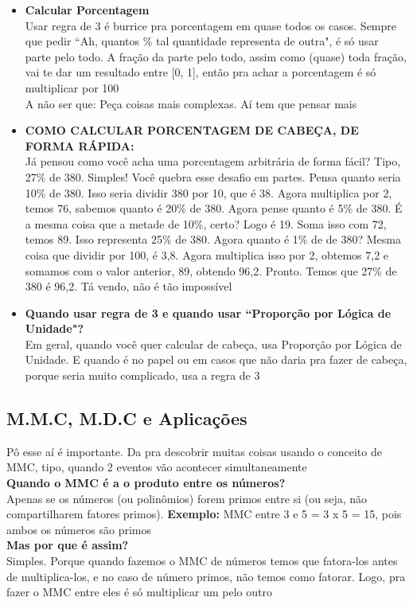 \documentclass{article}
\begin{document}
\begin{itemize}
    \item \textbf{Calcular Porcentagem}\\[5pt] Usar regra de 3 é burrice pra porcentagem em quase todos os casos. Sempre que pedir ``Ah, quantos \% tal quantidade representa de outra", é só usar parte pelo todo. A fração da parte pelo todo, assim como (quase) toda fração, vai te dar um resultado entre [0, 1], então pra achar a porcentagem é só multiplicar por 100
    \\[5pt]
    A não ser que: Peça coisas mais complexas. Aí tem que pensar mais

    \item \textbf{COMO CALCULAR PORCENTAGEM DE CABEÇA, DE FORMA RÁPIDA:}\\[5pt] Já pensou como você acha uma porcentagem arbitrária de forma fácil? Tipo, 27\% de 380. Simples! Você quebra esse desafio em partes. Pensa quanto seria 10\% de 380. Isso seria dividir 380 por 10, que é 38. Agora multiplica por 2, temos 76, sabemos quanto é 20\% de 380. Agora pense quanto é 5\% de 380. É a mesma coisa que a metade de 10\%, certo? Logo é 19. Soma isso com 72, temos 89. Isso representa 25\% de 380. Agora quanto é 1\% de de 380? Mesma coisa que dividir por 100, é 3,8. Agora multiplica isso por 2, obtemos 7,2 e somamos com o valor anterior, 89, obtendo 96,2. Pronto. Temos que 27\% de 380 é 96,2. Tá vendo, não é tão impossível 

    \item \textbf{Quando usar regra de 3 e quando usar ``Proporção por Lógica de Unidade"?}\\[5pt] Em geral, quando você quer calcular de cabeça, usa Proporção por Lógica de Unidade. E quando é no papel ou em casos que não daria pra fazer de cabeça, porque seria muito complicado, usa a regra de 3
\end{itemize}

\subsection{M.M.C, M.D.C e Aplicações}
Pô esse aí é importante. Da pra descobrir muitas coisas usando o conceito de MMC, tipo, quando 2 eventos vão acontecer simultaneamente
\\[5pt]
\textbf{Quando o MMC é a o produto entre os números?}
\\[5pt]
Apenas se os números (ou polinômios) forem primos entre si (ou seja, não compartilharem fatores primos). \textbf{Exemplo:} MMC entre 3 e 5 = 3 x 5 = 15, pois ambos os números são primos
\\[5pt]
\textbf{Mas por que é assim?}
\\[5pt]
Simples. Porque quando fazemos o MMC de números temos que fatora-los antes de multiplica-los, e no caso de número primos, não temos como fatorar. Logo, pra fazer o MMC entre eles é só multiplicar um pelo outro
\end{document}
